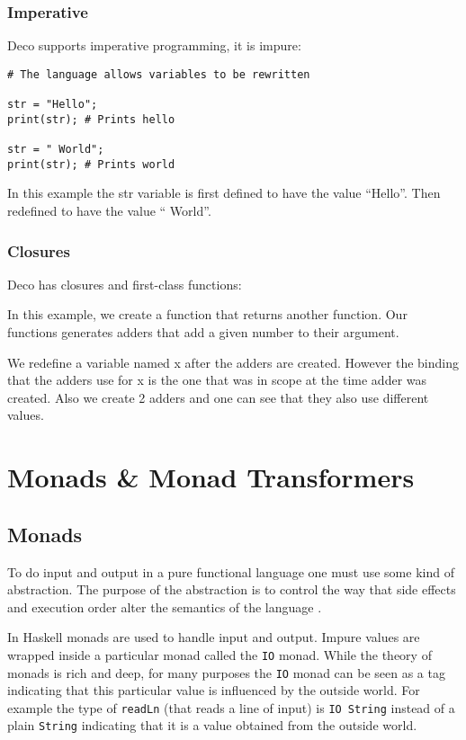 \documentclass[]{article}
\newcommand{\function}[1]{\texttt{#1}}
\newcommand{\type}[1]{\texttt{#1}}
\begin{document}
\subsubsection{Imperative}
Deco supports imperative programming, it is impure:
\begin{verbatim}
# The language allows variables to be rewritten

str = "Hello";
print(str); # Prints hello

str = " World";
print(str); # Prints world
\end{verbatim}

In this example the str variable is first defined
to have the value ``Hello''. Then redefined to have
the value `` World''.

\subsubsection{Closures}
Deco has closures and first-class functions:


In this example, we create a function that returns another function. Our
functions generates adders that add a given number to their argument.

We redefine a variable named x after the adders are created. However the
binding that the adders use for x is the one that was in scope at the time
adder was created. Also we create 2 adders and one can see that they also use
different values.



\section{Monads \& Monad Transformers}
\subsection{Monads}

To do input and output in a pure functional language one must use some kind of
abstraction. The purpose of the abstraction is to control the way that side
effects and execution order alter the semantics of the language
\cite{PeytonJones:2001}.

In Haskell monads are used to handle input and output. Impure values are
wrapped inside a particular monad called the \type{IO} monad. While the theory
of monads is rich and deep, for many purposes the \type{IO} monad can be seen
as a tag indicating that this particular value is influenced by the outside
world. For example the type of \function{readLn} (that reads a line of input)
is \type{IO String} instead of a plain \type{String} indicating that it is a
value obtained from the outside world.
\end{document}
